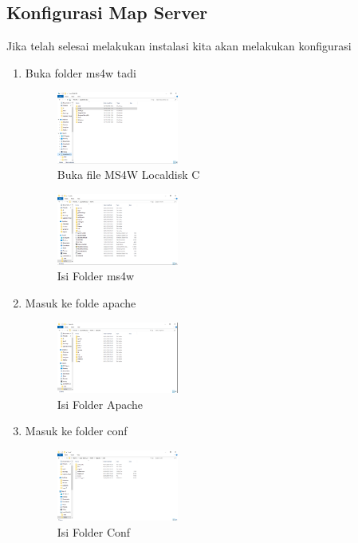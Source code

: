 \subsection{Konfigurasi Map Server}
Jika telah selesai melakukan instalasi kita akan melakukan konfigurasi
\begin{enumerate}
  \item Buka folder ms4w tadi
  \hfill\break
    \begin{figure}[H]
		\includegraphics[width=4cm]{figures/1174039/tugas4/3.png}
		\centering
		\caption{ Buka file MS4W Localdisk C}
    \end{figure}
    \hfill\break
    \begin{figure}[H]
		\includegraphics[width=4cm]{figures/1174039/tugas4/4.png}
		\centering
		\caption{Isi Folder ms4w}
    \end{figure}
  \item Masuk ke folde apache
  \hfill\break
    \begin{figure}[H]
		\includegraphics[width=4cm]{figures/1174039/tugas4/5.png}
		\centering
		\caption{Isi Folder Apache}
    \end{figure}
  \item Masuk ke folder conf
  \hfill\break
    \begin{figure}[H]
		\includegraphics[width=4cm]{figures/1174039/tugas4/6.png}
		\centering
		\caption{Isi Folder Conf}
    \end{figure}

\end{enumerate}
